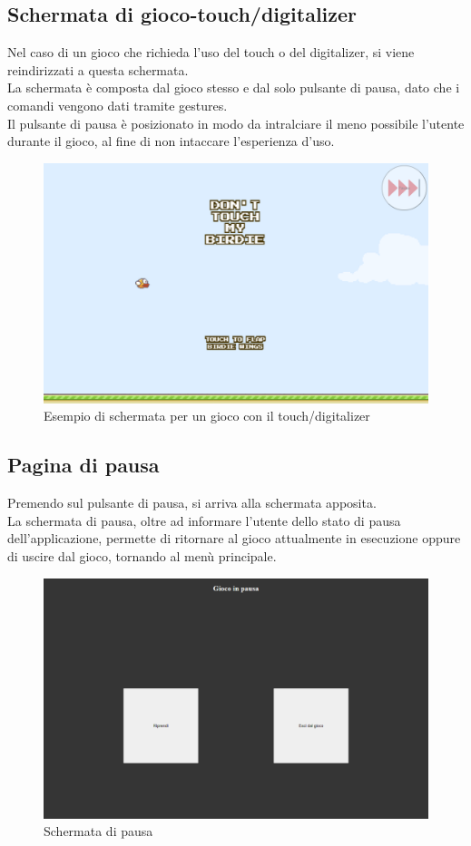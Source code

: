 \subsection{Schermata di gioco-touch/digitalizer}
Nel caso di un gioco che richieda l'uso del touch o del digitalizer, si viene reindirizzati a questa schermata.\\
La schermata è composta dal gioco stesso e dal solo pulsante di pausa, dato che i comandi vengono dati tramite gestures.\\
Il pulsante di pausa è posizionato in modo da intralciare il meno possibile l'utente durante il gioco, al fine di non intaccare l'esperienza d'uso.
\begin{figure}[h]
    \centering
    \includegraphics[width=340pt]{schermataGiocoTouchDigit.png}
    \caption{Esempio di schermata per un gioco con il touch/digitalizer}
    \label{fig:schermataGiocoTouchDigit}
\end{figure}
\newpage
\subsection{Pagina di pausa}
Premendo sul pulsante di pausa, si arriva alla schermata apposita.\\
La schermata di pausa, oltre ad informare l'utente dello stato di pausa dell'applicazione, permette di ritornare al gioco attualmente in esecuzione oppure di uscire dal gioco, tornando al menù principale.
\begin{figure}[h]
    \centering
    \includegraphics[width=340pt]{schermataPausaGioco.png}
    \caption{Schermata di pausa}
    \label{fig:schermataPausaGioco}
\end{figure}

